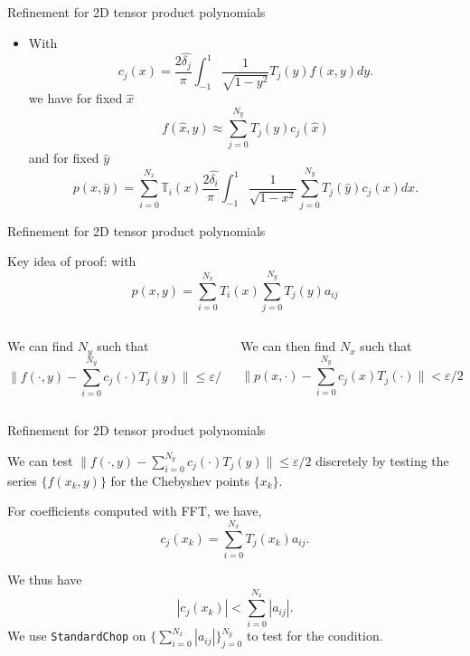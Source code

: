 \documentclass{beamer}
\newcommand{\T}{\mathbb{T}}
\begin{document}
\begin{frame}{Refinement for 2D tensor product polynomials}
\begin{itemize}
\item With $$
 	c_j(x) = \frac{2 \hat{\delta_j}}{\pi} \int_{-1}^{1} \frac{1}{\sqrt{1-y^2}}T_j(y)f(x,y)dy.
$$ we have for fixed $\hat{x}$
$$
f(\hat{x},y) \approx \sum_{j=0}^{N_y}T_j(y)c_j(\hat{x})
$$
and for fixed $\hat{y}$
$$
p(x,\hat{y}) = \sum_{i=0}^{N_x} \T_i(x) \frac{2 \hat{\delta_i}}{\pi} \int_{-1}^{1} \frac{1}{\sqrt{1-x^2}} \sum_{j=0}^{N_y}T_j(\hat{y})c_j(x) dx.
$$

\end{itemize}
\end{frame}


\begin{frame}[t]{Refinement for 2D tensor product polynomials}

\begin{center}
Key idea of proof: with $$p(x,y)=\sum_{i=0}^{N_x} T_i(x) \sum_{j=0}^{N_y} T_j(y)a_{ij}$$
\end{center}

\begin{columns}[t]
\begin{column}[t]{0.5\textwidth}
We can find $N_y$ such that
$$\|f(\cdot,y) -\sum_{i=0}^{N_y} c_j(\cdot)T_j(y) \| \leq \varepsilon/2$$
\end{column}
\begin{column}[t]{0.5\textwidth}
\begin{center}
We can then find $N_x$ such that
$$\|p(x,\cdot) - \sum_{i=0}^{N_y} c_j(x)T_j(\cdot)\|<\varepsilon/2,$$
\end{center}	
\end{column}

\end{columns}

\end{frame}


\begin{frame}{Refinement for 2D tensor product polynomials}
\begin{center}
We can test $\|f(\cdot,y) -\sum_{i=0}^{N_y} c_j(\cdot)T_j(y) \| \leq \varepsilon/2$ discretely by testing the series  $\{f(x_k,y)\}$ for the Chebyshev points $\{x_k\}$.
\end{center}

\begin{center}
For coefficients computed with FFT, we have,
$$ c_j(x_k) = \sum_{i=0}^{N_x}T_j(x_k)a_{ij}. $$
\end{center}

\begin{center}
We thus have
$$ |c_j(x_k)| < \sum_{i=0}^{N_x} |a_{ij}|. $$ We use {\tt StandardChop} on $\{ \sum_{i=0}^{N_x} |a_{ij}|  \}_{j=0}^{N_y}$ to test for the condition.
\end{center}

\end{frame}
\end{document}
